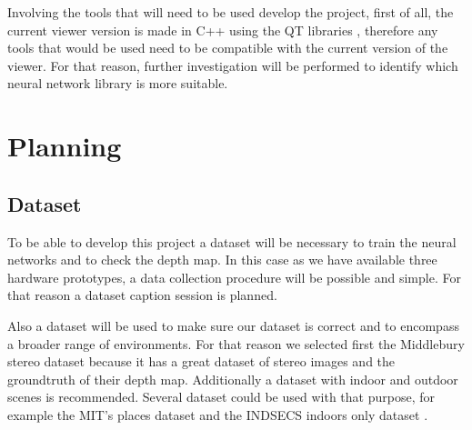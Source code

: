 \documentclass[10pt,a4paper,twocolumn,twoside]{article}
\begin{document}

Involving the tools that will need to be used develop the project, first of all, the current viewer version is made in C++ using the QT libraries \cite{web:qt}, therefore any tools that would be used need to be compatible with the current version of the viewer. For that reason, further investigation will be performed to identify which neural network library is more suitable.

\section{Planning}
\label{sec:planning}

\subsection{Dataset}
To be able to develop this project a dataset will be necessary to train the neural networks and to check the depth map. In this case as we have available three hardware prototypes, a data collection procedure will be possible and simple. For that reason a dataset caption session is planned.

Also a dataset will be used to make sure our dataset is correct and to encompass a broader range of environments. For that reason we selected first the Middlebury stereo dataset \cite{web:middelburyDataset} because it has a great dataset of stereo images and the groundtruth of their depth map. Additionally a dataset with indoor and outdoor scenes is recommended. Several dataset could be used with that purpose, for example the MIT's places dataset \cite{web:mitplaces} and the INDSECS indoors only dataset \cite{web:indecs}.
\end{document}

